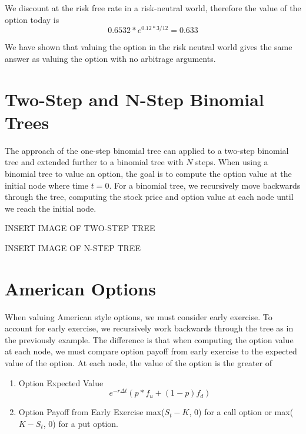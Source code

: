 \documentclass{article}\usepackage[]{graphicx}\usepackage[]{color}
\begin{document}
We discount at the risk free rate in a risk-neutral world, therefore the value of the option today is
\begin{equation*}
0.6532 * e^{0.12 * 3 / 12} = 0.633
\end{equation*}

We have shown that valuing the option in the risk neutral world gives the same answer as valuing the option with no arbitrage arguments.

\section{Two-Step and N-Step Binomial Trees}
The approach of the one-step binomial tree can applied to a two-step binomial tree and extended further to a binomial tree with $N$ steps. When using a binomial tree to value an option, the goal is to compute the option value at the initial node where time $t = 0$. For a binomial tree, we recursively move backwards through the tree, computing the stock price and option value at each node  until we reach the initial node.

INSERT IMAGE OF TWO-STEP TREE

INSERT IMAGE OF N-STEP TREE

\section{American Options}
When valuing American style options, we must consider early exercise. To account for early exercise, we recursively work backwards through the tree as in the previously example. The difference is that when computing the option value at each node, we must compare option payoff from early exercise to the expected value of the option. At each node, the value of the option is the greater of

\begin{enumerate}
  \item Option Expected Value
  \begin{equation*}
  e^{-r \Delta t} ( p * f_u + (1 - p) f_d)
  \end{equation*}
  \item
  Option Payoff from Early Exercise\newline
  max($S_t - K$, 0) for a call option or max($K - S_t$, 0) for a put option.
\end{enumerate}
\end{document}
